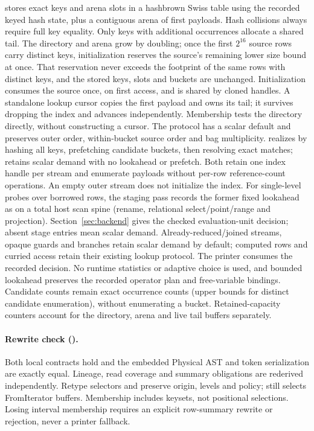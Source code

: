  stores exact keys and arena slots in a hashbrown Swiss table
using the recorded keyed hash state, plus a contiguous arena of first payloads.
Hash collisions always require full key equality.
Only keys with additional occurrences allocate a shared tail.
The directory and arena grow by doubling; once the first $2^{16}$ source rows
carry distinct keys, initialization reserves the source's remaining lower size
bound at once. That reservation never exceeds the footprint of the same rows
with distinct keys, and the stored keys, slots and buckets are unchanged.
Initialization consumes the source once, on first access, and is shared by
cloned handles. A standalone lookup cursor copies the first payload and owns
its tail; it survives dropping the index and advances independently.
Membership tests the directory directly, without constructing a cursor.
The  protocol has a scalar default and preserves outer
order, within-bucket source order and bag multiplicity.  realizes
 by hashing all keys, prefetching candidate buckets, then resolving
exact matches;  retains scalar demand with no lookahead or prefetch.
Both retain one index handle per stream and enumerate payloads without per-row
reference-count operations. An empty outer stream does not initialize the index.
For single-level probes over borrowed rows, the staging pass records the former
fixed lookahead as  on a total host scan spine
(rename, relational select/point/range and projection).
Section~\ref{sec:backend} gives the checked evaluation-unit decision; absent
stage entries mean scalar demand. Already-reduced/joined streams, opaque guards
and branches retain scalar demand by default; computed rows and curried access
retain their existing lookup protocol. The printer consumes the recorded
decision. No runtime statistics or adaptive choice is used, and bounded
lookahead preserves the recorded operator plan and free-variable bindings.
Candidate counts remain exact occurrence counts (upper bounds for distinct
candidate enumeration), without enumerating a bucket. Retained-capacity
counters account for the directory, arena and live tail buffers separately.

\paragraph{Rewrite check ().} Both local
contracts hold and the embedded Physical AST and token serialization are exactly
equal. Lineage, read coverage and summary obligations are rederived independently.
Retype selectors  and  preserve origin,
levels and policy;  still selects FromIterator buffers. Membership
includes keysets, not positional selections. Losing interval membership requires an explicit row-summary
rewrite or rejection, never a printer fallback.

